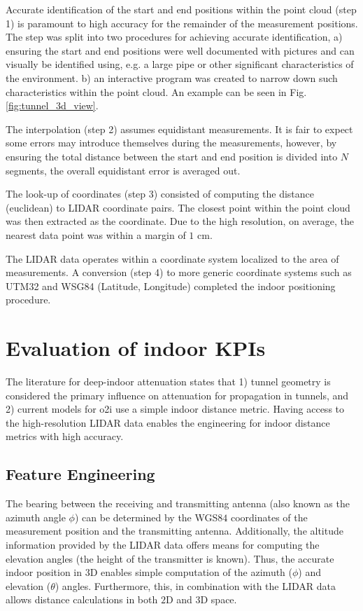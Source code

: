 Accurate identification of the start and end positions within the point cloud (step 1) is paramount to high accuracy for the remainder of the measurement positions. The step was split into two procedures for achieving accurate identification, a) ensuring the start and end positions were well documented with pictures and can visually be identified using, e.g. a large pipe or other significant characteristics of the environment. b) an interactive program was created to narrow down such characteristics within the point cloud. An example can be seen in Fig. \ref{fig:tunnel_3d_view}. 

The interpolation (step 2) assumes equidistant measurements. It is fair to expect some errors may introduce themselves during the measurements, however, by ensuring the total distance between the start and end position is divided into $N$ segments, the overall equidistant error is averaged out.

The look-up of coordinates (step 3) consisted of computing the distance (euclidean) to LIDAR coordinate pairs. The closest point within the point cloud was then extracted as the coordinate. Due to the high resolution, on average, the nearest data point was within a margin of $1$ cm.

The LIDAR data operates within a coordinate system localized to the area of measurements. A conversion (step 4)  to more generic coordinate systems such as UTM32 and WSG84 (Latitude, Longitude) \cite{alan_d_snow_2020_3714221} completed the indoor positioning procedure. 


\section{Evaluation of indoor KPIs}
The literature for deep-indoor attenuation states that 1) tunnel geometry is considered the primary influence on attenuation for propagation in tunnels, and 2) current models for \gls{o2i} use a simple indoor distance metric. Having access to the high-resolution LIDAR data enables the engineering for indoor distance metrics with high accuracy. 


\subsection{Feature Engineering}
The bearing between the receiving and transmitting antenna (also known as the azimuth angle $\phi$) can be determined by the WGS$84$ coordinates of the measurement position and the transmitting antenna. Additionally, the altitude information provided by the LIDAR data offers means for computing the elevation angles (the height of the transmitter is known). Thus, the accurate indoor position in $3$D enables simple computation of the azimuth ($\phi$) and elevation ($\theta$) angles. Furthermore, this, in combination with the LIDAR data allows distance calculations in both $2$D and $3$D space. 

